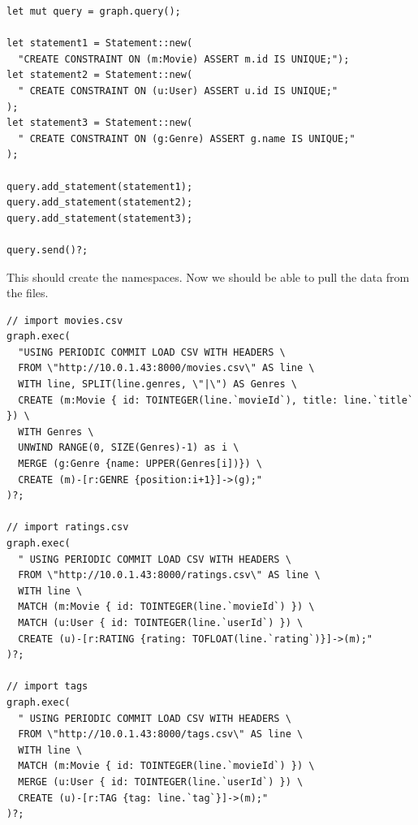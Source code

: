 \documentclass{book}
\begin{document}
\begin{lstlisting}[caption={chapter4\\/working\_with\_data\\/graph\_db\\/src\\/main\\.toml},basicstyle=\small]
let mut query = graph.query();

let statement1 = Statement::new(
  "CREATE CONSTRAINT ON (m:Movie) ASSERT m.id IS UNIQUE;");
let statement2 = Statement::new(
  " CREATE CONSTRAINT ON (u:User) ASSERT u.id IS UNIQUE;"
);
let statement3 = Statement::new(
  " CREATE CONSTRAINT ON (g:Genre) ASSERT g.name IS UNIQUE;"
);

query.add_statement(statement1);
query.add_statement(statement2);
query.add_statement(statement3);

query.send()?;
\end{lstlisting}

This should create the namespaces. Now we should be able to pull the data from the files.

\begin{lstlisting}[caption={chapter4\\/working\_with\_data\\/graph\_db\\/src\\/main\\.toml},basicstyle=\small]
// import movies.csv
graph.exec(
  "USING PERIODIC COMMIT LOAD CSV WITH HEADERS \
  FROM \"http://10.0.1.43:8000/movies.csv\" AS line \
  WITH line, SPLIT(line.genres, \"|\") AS Genres \
  CREATE (m:Movie { id: TOINTEGER(line.`movieId`), title: line.`title` }) \
  WITH Genres \
  UNWIND RANGE(0, SIZE(Genres)-1) as i \
  MERGE (g:Genre {name: UPPER(Genres[i])}) \
  CREATE (m)-[r:GENRE {position:i+1}]->(g);"
)?;

// import ratings.csv
graph.exec(
  " USING PERIODIC COMMIT LOAD CSV WITH HEADERS \
  FROM \"http://10.0.1.43:8000/ratings.csv\" AS line \
  WITH line \
  MATCH (m:Movie { id: TOINTEGER(line.`movieId`) }) \
  MATCH (u:User { id: TOINTEGER(line.`userId`) }) \
  CREATE (u)-[r:RATING {rating: TOFLOAT(line.`rating`)}]->(m);"
)?;

// import tags
graph.exec(
  " USING PERIODIC COMMIT LOAD CSV WITH HEADERS \
  FROM \"http://10.0.1.43:8000/tags.csv\" AS line \
  WITH line \
  MATCH (m:Movie { id: TOINTEGER(line.`movieId`) }) \
  MERGE (u:User { id: TOINTEGER(line.`userId`) }) \
  CREATE (u)-[r:TAG {tag: line.`tag`}]->(m);"
)?;
\end{lstlisting}
\end{document}
